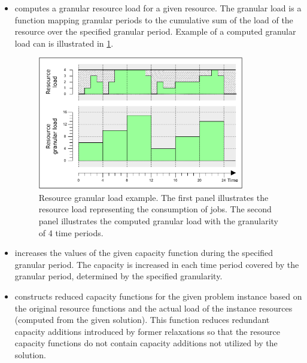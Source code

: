 \begin{itemize}
    \item {}
        computes a granular resource load for a given resource.
        The granular load is a function mapping granular periods to the cumulative sum of the load
        of the resource over the specified granular period.
        Example of a computed granular load can is illustrated in \cref{fig:granular-load}.

        \begin{figure}[hbt]
            \centering
            \includegraphics[width=0.85\textwidth]{img/GranularLoad.pdf}
            \caption{
                Resource granular load example.
                The first panel illustrates the resource load representing the consumption of jobs.
                The second panel illustrates the computed granular load with the granularity of 4 time periods.
                }
            \label{fig:granular-load}
        \end{figure}
        
    \item {}
        increases the values of the given capacity function during the specified granular period.
        The capacity is increased in each time period covered by the granular period,
        determined by the specified granularity.

    \item {}
        constructs reduced capacity functions for the given problem instance based on the original resource functions
        and the actual load of the instance resources (computed from the given solution).
        This function reduces redundant capacity additions introduced by former relaxations
        so that the resource capacity functions do not contain capacity additions not utilized by the solution.


\end{itemize}
